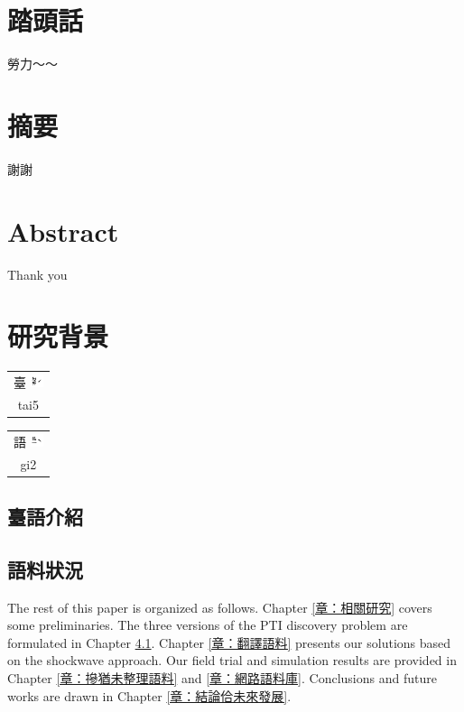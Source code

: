 \documentclass[final,oneside,onecolumn,12pt,a4paper]{book}%
\makeatletter
\newcommand{\rubybot}[2]{%
  \@tempdimc \f@size\p@
  \begin{tabular}[t]{@{}c@{}}
    #1\\[-3em]
    \fontsize{.8\@tempdimc}{.8\@tempdimc}\selectfont%
    \setlength{\normalbaselineskip}{0pt}#2 
  \end{tabular}%
}
\makeatother
\begin{document}
\frontmatter
\chapter{踏頭話}
勞力～～
\newpage

\chapter{摘要}
謝謝

\newpage

\chapter{Abstract}

Thank you

\newpage

\tableofcontents
\listoffigures
\listoftables



\mainmatter


\chapter{研究背景}
\label{章：研究背景}

\rubybot{臺 \includegraphics[height=1em]{圖/⿳⿳ㄉㄞˊ}}{tai5}
\rubybot{語 \includegraphics[height=1em]{圖/⿳⿳ㆣㄧˋ}}{gi2}

\section{臺語介紹}
\label{章：臺語介紹}

\section{語料狀況}
\label{節：語料狀況}

The rest of this paper is organized as follows. Chapter
\ref{章：相關研究} covers some preliminaries.
The three versions of the PTI discovery problem are formulated in Chapter
\ref{章：臺語介紹}. Chapter \ref{章：翻譯語料} presents our
solutions based on the shockwave approach. Our field trial and simulation
results are provided in Chapter \ref{章：摻猶未整理語料} and
\ref{章：網路語料庫}. Conclusions and future works are drawn in Chapter
\ref{章：結論佮未來發展}.
\end{document}
